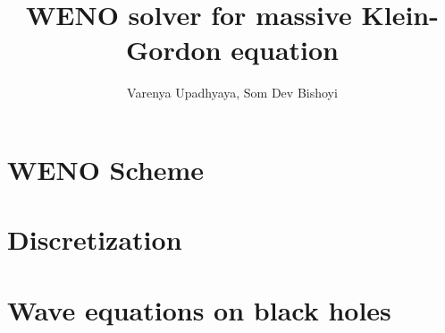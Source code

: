 \documentclass{article}[14pt]
\author{Varenya Upadhyaya, Som Dev Bishoyi}
\title{WENO solver for massive Klein-Gordon equation}
\begin{document}
\maketitle
\section{WENO Scheme}
\section{Discretization}
\section{Wave equations on black holes}
\appendix
\end{document}
